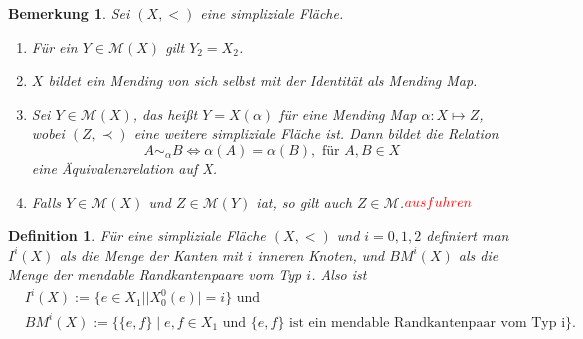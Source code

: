 \documentclass[12pt,titlepage]{article}
\newtheorem{definition}{Definition}[section]
\newtheorem{bemerkung}{Bemerkung}[section]
\begin{document}
  \begin{bemerkung}
  Sei $(X,<)$ eine simpliziale Fläche.
  \begin{enumerate}
  \item Für ein $Y \in \mathcal{M}(X)$ gilt $Y_2=X_2$.
  \item $X$ bildet ein Mending von sich selbst mit der Identität als Mending Map.
  \item Sei $Y\in \mathcal{M}(X)$, das heißt $Y=X(\alpha)$ für eine Mending Map $\alpha:X \mapsto Z$, wobei $(Z,\prec)$ eine weitere simpliziale Fläche ist. Dann bildet die Relation 
  \[
A\sim_\alpha B \Leftrightarrow \alpha(A)=\alpha(B),\text{ für }A,B \in X
  \]
  eine Äquivalenzrelation auf X.
  \item Falls $Y\in \mathcal{M}(X)$ und $Z \in \mathcal{M}(Y)$ iat, so gilt auch $Z\in \mathcal{M}$.$\textcolor{red}{ausfuhren}$
  \end{enumerate}
  \end{bemerkung}
  
  \begin{definition}
  Für eine simpliziale Fläche $(X,<)$ und $i=0,1,2$ definiert man $I^{i}(X)$ als die Menge der Kanten mit $i$ inneren Knoten, und $BM^{i}(X)$ als die Menge der mendable Randkantenpaare vom Typ $i$. Also ist
  \begin{align*}
  &I^i(X):=\{e \in X_1 \mid \vert X_{0}^{0}(e)\vert=i\}\text{ und}\\
  &BM^{i}(X):=\{\{e,f\} \mid e,f \in X_1 \text{ und }\{e,f\}\text{ ist ein mendable Randkantenpaar vom Typ i}\}.\\
  \end{align*}
  \end{definition}
  
  
\end{document}
